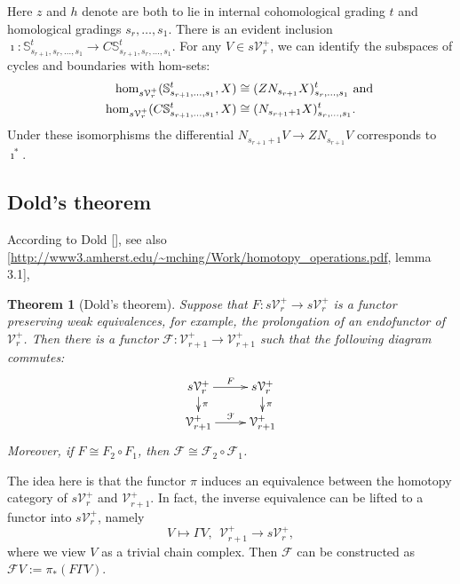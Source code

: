 \documentclass[11pt]{amsart}
\theoremstyle{plain}
\newtheorem{thm}{Theorem}[section]
\theoremstyle{definition}
\renewcommand{\to}{\longrightarrow}
\newcommand{\calF}{\mathcal{F}}
\newcommand{\calV}{\mathcal{V}}
\theoremstyle{plain}
\newcommand{\vect}[2]{\calV^{#1}_{#2}}
\begin{document}
\begin{Conventions and notation}
Here $z$ and $h$ denote are both to lie in internal cohomological grading $t$ and homological gradings $s_r,\ldots,s_1$.
There is an evident inclusion $\imath:\mathbb{S}_{s_{r+1},s_r,\ldots,s_1}^t\to C\mathbb{S}_{s_{r+1},s_r,\ldots,s_1}^t$. For any $V\in s\vect{+}{r}$, we can identify the subspaces of cycles and boundaries with hom-sets:
\begin{alignat*}{2}
\hom_{s\vect{+}{r}}(\mathbb{S}^t_{s_{r+1},\ldots,s_1},X)&\cong (ZN_{s_{r+1}}X)_{s_r,\ldots,s_1}^t\makebox[0cm][l]{ and}\\
\hom_{s\vect{+}{r}}(C\mathbb{S}^t_{s_{r+1},\ldots,s_1},X)&\cong (N_{s_{r+1}+1}X)_{s_r,\ldots,s_1}^t.
\end{alignat*}
Under these isomorphisms the differential $N_{s_{r+1}+1}V\to ZN_{s_{r+1}}V$ corresponds to $\imath^*$.

\subsection{Dold's theorem}
According to Dold [], see also [\url{http://www3.amherst.edu/~mching/Work/homotopy_operations.pdf}, lemma 3.1], 
\begin{thm}[Dold's theorem]\label{Dold's theorem}
Suppose that $F:s\vect{+}{r}\to s\vect{+}{r}$ is a functor preserving weak equivalences, for example, the prolongation of an endofunctor of $\vect{+}{r}$. Then there is a functor $\calF:\vect{+}{r+1}\to\vect{+}{r+1}$ such that the following diagram commutes:
\[\xymatrix@R=4mm{
s\vect{+}{r}\ar[r]^-{F}
\ar[d]^-{\pi}
&%
s\vect{+}{r}\ar[d]^-{\pi}
\\%
\vect{+}{r+1}\ar[r]^-{\calF}
&
\vect{+}{r+1}
}\]
Moreover, if $F\cong F_2\circ F_1$, then $\calF\cong \calF_2\circ \calF_1$.
\end{thm}
\noindent The idea here is that the functor $\pi$ induces an equivalence between the homotopy category of $s\vect{+}{r}$ and $\vect{+}{r+1}$. In fact, the inverse equivalence can be lifted to a functor into $s\vect{+}{r}$, namely 
\[V\mapsto \Gamma V,\ \ \vect{+}{r+1}\to s\vect{+}{r},\]
where we view $V$ as a trivial chain complex. Then $\calF$ can be constructed as $\calF V:=\pi_*(F\Gamma V)$.



\end{Conventions and notation}
\end{document}
